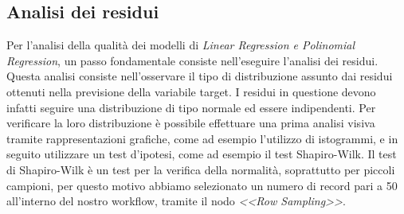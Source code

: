 \documentclass[12pt, a4paper, twocolumn]{article} %
\begin{document}
\subsection{Analisi dei residui}
Per l'analisi della qualità dei modelli di \textit{Linear Regression e Polinomial Regression}, un passo fondamentale consiste nell'eseguire l'analisi dei residui. Questa analisi consiste nell'osservare il tipo di distribuzione assunto dai residui ottenuti nella previsione della variabile target. I residui in questione devono infatti seguire una distribuzione di tipo normale ed essere indipendenti.
Per verificare la loro distribuzione è possibile effettuare una prima analisi visiva tramite rappresentazioni grafiche, come ad esempio l'utilizzo di istogrammi, e in seguito utilizzare un test d'ipotesi, come ad esempio il test Shapiro-Wilk. Il test di Shapiro-Wilk è un test per la verifica della normalità, soprattutto per piccoli campioni, per questo motivo abbiamo selezionato un numero di record pari a 50 all'interno del nostro workflow, tramite il nodo \textit{<<Row Sampling>>}.
\end{document}
